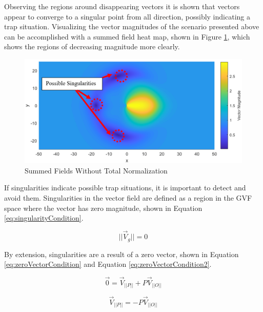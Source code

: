 \documentclass[numbered,pdftex]{ohio-etd}
\begin{document}
Observing the regions around disappearing vectors it is shown that vectors appear to converge to a singular point from all direction, possibly indicating a trap situation. Visualizing the vector magnitudes of the scenario presented above can be accomplished with a summed field heat map, shown in Figure \ref{fig:summedHeatMap}, which shows the regions of decreasing magnitude more clearly. 


\begin{figure}[H]
	\centering
	\includegraphics[trim=0 0 0 0,clip,width=14cm]{Figures/methods/summedHeatMapSimple2}
	\caption{Summed Fields Without Total Normalization}
	\label{fig:summedHeatMap}
\end{figure}

If singularities indicate possible trap situations, it is important to detect and avoid them. Singularities in the vector field are defined as a region in the GVF space where the vector has zero magnitude, shown in Equation \ref{eq:singularityCondition}.


\begin{equation}
\label{eq:singularityCondition}
||\overrightarrow{V}_g || = 0
\end{equation}

\noindent
By extension, singularities are a result of a zero vector, shown in Equation \ref{eq:zeroVectorCondition} and Equation \ref{eq:zeroVectorCondition2}.



\begin{equation}
\label{eq:zeroVectorCondition}
\overrightarrow{0} = \overrightarrow{V}_{||P||} +P\overrightarrow{V}_{||O||}
\end{equation}

\begin{equation}
\label{eq:zeroVectorCondition2}
\overrightarrow{V}_{||P||}=-P\overrightarrow{V}_{||O||}
\end{equation}
\end{document}
